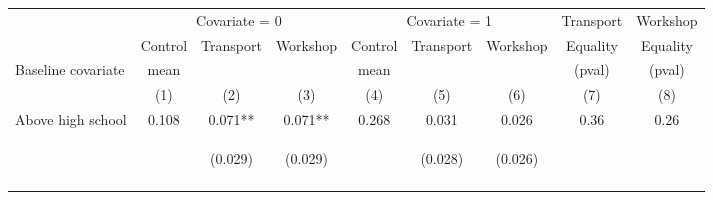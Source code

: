 \begin{tabular}{lcccccccc}
\hline \noalign{\smallskip} & \multicolumn{3}{c}{Covariate = 0} & \multicolumn{3}{c}{Covariate = 1} & Transport & Workshop\\
\cmidrule(lr){2-4}\cmidrule(lr){5-7}\cmidrule(lr){8-9} & Control & {Transport} & {Workshop} & Control & {Transport} & {Workshop} & {Equality} & {Equality}\\
Baseline covariate & mean &  &  & mean &  &  & (pval) & (pval)\\
 & (1) & (2) & (3) & (4) & (5) & (6) & (7) & (8)\\
\noalign{\smallskip}\hline \noalign{\smallskip}Above high school & 0.108 & 0.071** & 0.071** & 0.268 & 0.031 & 0.026 & 0.36 & 0.26\\
 & \begin{footnotesize}\end{footnotesize} & \begin{footnotesize}(0.029)\end{footnotesize} & \begin{footnotesize}(0.029)\end{footnotesize} & \begin{footnotesize}\end{footnotesize} & \begin{footnotesize}(0.028)\end{footnotesize} & \begin{footnotesize}(0.026)\end{footnotesize} & \begin{footnotesize}\end{footnotesize} & \begin{footnotesize}\end{footnotesize}\\
 & \begin{footnotesize}\end{footnotesize} & \begin{footnotesize}[0.021]\end{footnotesize} & \begin{footnotesize}[0.020]\end{footnotesize} & \begin{footnotesize}\end{footnotesize} & \begin{footnotesize}[0.505]\end{footnotesize} & \begin{footnotesize}[0.571]\end{footnotesize} & \begin{footnotesize}\end{footnotesize} & \begin{footnotesize}\end{footnotesize}\\

\end{tabular}
